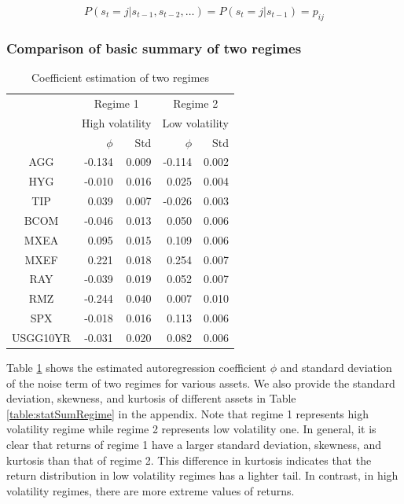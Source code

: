 \documentclass[11pt]{article}
\begin{document}
\begin{equation}
P(s_t = j|s_{t-1}, s_{t-2}, \dots) = P(s_t = j|s_{t-1})  = p_{ij}
\end{equation}

\subsubsection{Comparison of basic summary of two regimes}

\begin{table}
\centering 
\begin{tabular}{ | c || r r | r r | } 
    \hline
    & \multicolumn{2}{c|}{Regime 1}  & 
    \multicolumn{2}{c|}{Regime 2} \\
     & \multicolumn{2}{c|}{High volatility}  & 
    \multicolumn{2}{c|}{Low volatility} \\
    & $\phi$ & Std & $\phi$ &  Std \\
     \hline \hline
    AGG  & -0.134 & 0.009 & -0.114 & 0.002 \\ 
    HYG & -0.010 & 0.016 & 0.025 & 0.004 \\ 
    TIP &  0.039 & 0.007 & -0.026 & 0.003 \\ 
    BCOM & -0.046 & 0.013 & 0.050 & 0.006 \\ 
    MXEA & 0.095 & 0.015 & 0.109 & 0.006 \\ 
    MXEF & 0.221 & 0.018 & 0.254 & 0.007\\ 
    RAY& -0.039  & 0.019 & 0.052 & 0.007\\ 
    RMZ & -0.244 & 0.040 & 0.007 & 0.010\\ 
    SPX & -0.018 & 0.016 & 0.113 & 0.006\\ 
    USGG10YR & -0.031 & 0.020 & 0.082 & 0.006\\ 
    \hline
\end{tabular}
\caption{Coefficient estimation of two regimes} 
\label{table:autoCoeffRegime}
\end{table} 

Table \ref{table:autoCoeffRegime} shows the estimated autoregression coefficient $\phi$ and standard deviation of the noise term of two regimes for various assets. We also provide the standard deviation, skewness, and kurtosis of different assets in Table \ref{table:statSumRegime} in the appendix. Note that regime 1 represents high volatility regime while regime 2 represents low volatility one. In general, it is clear that returns of regime 1 have a larger standard deviation, skewness, and kurtosis than that of regime 2. This difference in kurtosis indicates that the return distribution in low volatility regimes has a lighter tail. In contrast, in high volatility regimes, there are more extreme values of returns.
\end{document}

